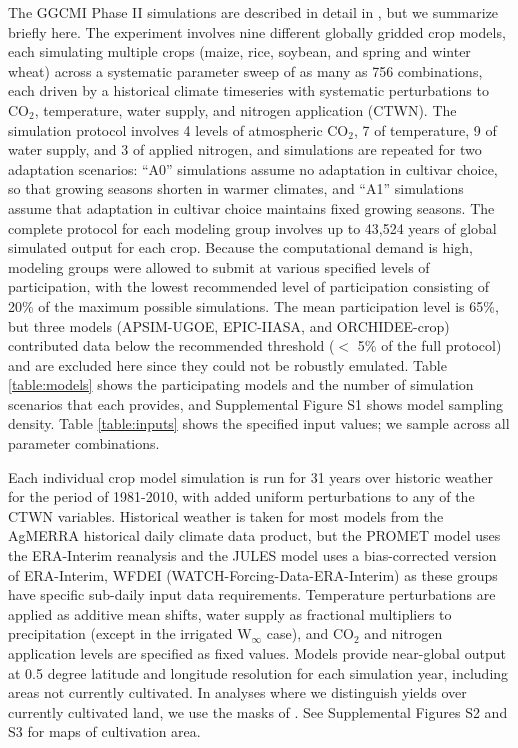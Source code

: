 \documentclass[gmd, manuscript]{copernicus} %
\begin{document}
The GGCMI Phase II simulations are described in detail in \citet{franke2019ctwnexperiment}, but we summarize briefly here. 
The experiment involves nine different globally gridded crop models, each simulating multiple crops (maize, rice, soybean, and spring and winter wheat) across a systematic parameter sweep of as many as 756 combinations, each driven by a historical climate timeseries with systematic perturbations to CO$_2$, temperature, water supply, and nitrogen application (CTWN). 
The simulation protocol involves 4 levels of atmospheric CO$_2$, 7 of temperature, 9 of water supply, and 3 of applied nitrogen, and simulations are repeated for two adaptation scenarios: ``A0'' simulations assume no adaptation in cultivar choice, so that growing seasons shorten in warmer climates, and ``A1'' simulations assume that adaptation in cultivar choice maintains fixed growing seasons.
The complete protocol for each modeling group involves up to 43,524 years of global simulated output for each crop. 
Because the computational demand is high, modeling groups were allowed to submit at various specified levels of participation, with the lowest recommended level of participation consisting of 20\% of the maximum possible simulations. The mean participation level is 65\%, but three models (APSIM-UGOE, EPIC-IIASA, and ORCHIDEE-crop) contributed data below the recommended threshold ($<$ 5\% of the full protocol) and are excluded here since they could not be robustly emulated. 
Table \ref{table:models} shows the participating models and the number of simulation scenarios that each provides, and Supplemental Figure S1 shows model sampling density. Table \ref{table:inputs} shows the specified input values; we sample across all parameter combinations. 

Each individual crop model simulation is run for 31 years over historic weather for the period of 1981-2010, with added uniform perturbations to any of the CTWN variables.
Historical weather is taken for most models from the AgMERRA \citep{Ruane2015} historical daily climate data product, but the PROMET model uses the ERA-Interim reanalysis \citep{dee2011era} and the JULES model uses a bias-corrected version of ERA-Interim, WFDEI (WATCH-Forcing-Data-ERA-Interim) \citep{weedon2014wfdei} as these groups have specific sub-daily input data requirements. 
Temperature perturbations are applied as additive mean shifts, water supply as fractional multipliers to precipitation (except in the irrigated W$_{\infty}$ case), and CO$_2$ and nitrogen application levels are specified as fixed values. 
Models provide near-global output at 0.5 degree latitude and longitude resolution for each simulation year, including areas not currently cultivated. 
In analyses where we distinguish yields over currently cultivated land, we use the masks of \citet{Portmann2010}. 
See Supplemental Figures S2 and S3 for maps of cultivation area.
\end{document}
